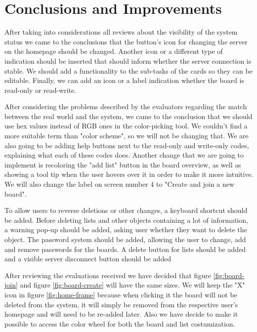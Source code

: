 \section{Conclusions and Improvements}

After taking into considerations all reviews about the visibility of the system status we came to the conclusions that the button's icon for changing the server on the homepage should be changed. Another icon or a different type of indication should be inserted that should inform whether the server connection is stable. We should add a functionality to the sub-tasks of the cards so they can be editable. Finally, we can add an icon or a label indication whether the board is read-only or read-write.

After considering the problems described by the evaluators regarding the match between the real world and the system, we came to the conclusion that we should use hex values instead of RGB ones in the color-picking tool. We couldn't find a more suitable term than "color scheme", so we will not be changing that. We are also going to be adding help buttons next to the read-only and write-only codes, explaining what each of these codes does. Another change that we are going to implement is recoloring the "add list" button in the board overview, as well as showing a tool tip when the user hovers over it in order to make it more intuitive. We will also change the label on screen number 4 to "Create and join a new board".

To allow users to reverse deletions or other changes, a keyboard shortcut should be added. Before deleting lists and other objects containing a lot of information, a warning pop-up should be added, asking user whether they want to delete the object. The password system should be added, allowing the user to change, add and remove passwords for the boards. A delete button for lists should be added and a visible server disconnect button should be added

After reviewing the evaluations received we have decided that figure \ref{fig:board-join} and figure \ref{fig:board-create}  will have the same sizes.  We will keep the "X" icon in figure \ref{fig:home-frame} because when clicking it the board will not be deleted from the system, it will simply be removed from the respective user's homepage and will need to be re-added later. Also we have decide to make it possible to access the color wheel for both the board and list costumization.

